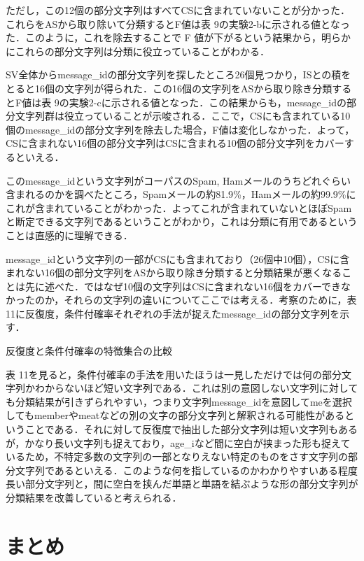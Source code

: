 \documentclass[japanese]{jnlp_1.4}
\begin{document}
ただし，この12個の部分文字列はすべてCSに含まれていないことが分かった．これらをASから取り除いて分類するとF値は表 
9の実験2-bに示される値となった．このように，これを除去することで F 値が下がるという結果から，明らかにこれらの部分文字列は分類に役立っていることがわかる．

SV全体からmessage{\_}idの部分文字列を探したところ26個見つかり，ISとの積をとると16個の文字列が得られた．この16個の文字列をASから取り除き分類するとF値は表 
9の実験2-cに示される値となった．この結果からも，message{\_}idの部分文字列群は役立っていることが示唆される．ここで，CSにも含まれている10個のmessage{\_}idの部分文字列を除去した場合，F値は変化しなかった．よって，CSに含まれない16個の部分文字列はCSに含まれる10個の部分文字列をカバーするといえる．

 このmessage{\_}idという文字列がコーパスのSpam, Hamメールのうちどれぐらい含まれるのかを調べたところ，Spamメールの約81.9{\%}，Hamメールの約99.9{\%}にこれが含まれていることがわかった．よってこれが含まれていないとほぼSpamと断定できる文字列であるということがわかり，これは分類に有用であるということは直感的に理解できる．

message{\_}idという文字列の一部がCSにも含まれており（26個中10個），CSに含まれない16個の部分文字列をASから取り除き分類すると分類結果が悪くなることは先に述べた．ではなぜ10個の文字列はCSに含まれない16個をカバーできなかったのか，それらの文字列の違いについてここでは考える．考察のために，表 
11に反復度，条件付確率それぞれの手法が捉えたmessage{\_}idの部分文字列を示す．

\begin{table}[t]
\caption{反復度と条件付確率の特徴集合の比較}

\end{table}

表 11を見ると，条件付確率の手法を用いたほうは一見しただけでは何の部分文字列かわからないほど短い文字列である．これは別の意図しない文字列に対しても分類結果が引きずられやすい，つまり文字列message{\_}idを意図してmeを選択してもmemberやmeatなどの別の文字の部分文字列と解釈される可能性があるということである．それに対して反復度で抽出した部分文字列は短い文字列もあるが，かなり長い文字列も捉えており，age{\_}iなど間に空白が挟まった形も捉えているため，不特定多数の文字列の一部となりえない特定のものをさす文字列の部分文字列であるといえる．このような何を指しているのかわかりやすいある程度長い部分文字列と，間に空白を挟んだ単語と単語を結ぶような形の部分文字列が分類結果を改善していると考えられる．


\section{まとめ}
\end{document}
